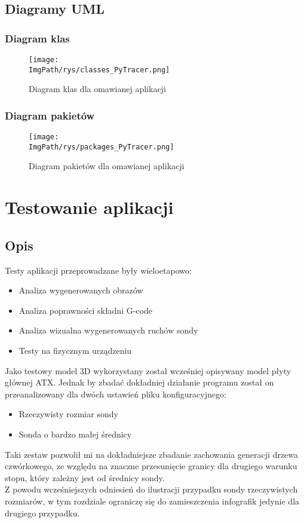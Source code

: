 \documentclass[a4paper,12pt,twoside,openany]{report}
\newcommand{\ImgPath}{.}
\begin{document}
  \section{Diagramy UML}
    \subsection{Diagram klas}
      \begin{figure}[!htbp]
        \begin{center}
      \centering
      \texttt{[image: \\ImgPath/rys/classes\_PyTracer.png]}
      \end{center}
        \caption{Diagram klas dla omawianej aplikacji}
        \label{classDiag}
      \end{figure}
      \clearpage
    
    \subsection{Diagram pakietów}
      \begin{figure}[!htbp]
        \begin{center}
      \centering
      \texttt{[image: \\ImgPath/rys/packages\_PyTracer.png]}
      \end{center}
        \caption{Diagram pakietów dla omawianej aplikacji}
        \label{packageDiag}
      \end{figure}
      \clearpage

\chapter{Testowanie aplikacji}
  \section{Opis}
    Testy aplikacji przeprowadzane były wieloetapowo:
    \begin{itemize}
      \item Analiza wygenerowanych obrazów
      \item Analiza poprawności składni G-code
      \item Analiza wizualna wygenerowanych ruchów sondy
      \item Testy na fizycznym urządzeniu
    \end{itemize}
    Jako testowy model 3D wykorzystany został wcześniej opisywany model płyty głównej ATX. Jednak by zbadać dokładniej działanie programu został on przeanalizowany 
    dla dwóch ustawień pliku konfiguracyjnego:
    \begin{itemize}
      \item Rzeczywisty rozmiar sondy
      \item Sonda o bardzo małej średnicy
    \end{itemize}
    Taki zestaw pozwolił mi na dokładniejsze zbadanie zachowania generacji drzewa czwórkowego, ze względu na znaczne przesunięcie granicy dla drugiego warunku 
    stopu, który zależny jest od średnicy sondy.\\
    Z powodu wcześniejszych odniesień do ilustracji przypadku sondy rzeczywistych rozmiarów, w tym rozdziale ograniczę się do zamieszczenia infografik jedynie dla 
    drugiego przypadku.
\end{document}

